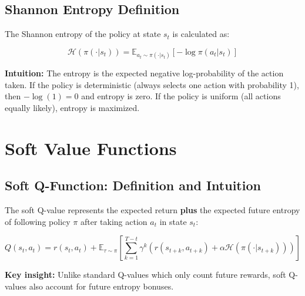 \documentclass[12pt,a4paper]{article}
\theoremstyle{noteplain}
\theoremstyle{noteexercise}
\begin{document}
\subsection{Shannon Entropy Definition}\label{ssec:shannon}



The Shannon entropy of the policy at state $s_t$ is calculated as:

\begin{equation}\label{eq:shannon}
\boxed{\mathcal{H}(\pi(\cdot|s_t)) = \mathbb{E}_{a_t \sim \pi(\cdot|s_t)}[-\log\pi(a_t|s_t)]}
\end{equation}

\textbf{Intuition:} The entropy is the expected negative log-probability of the action taken. If the policy is deterministic (always selects one action with probability 1), then $-\log(1) = 0$ and entropy is zero. If the policy is uniform (all actions equally likely), entropy is maximized.






\section{Soft Value Functions}\label{sec:soft-value}



\subsection{Soft Q-Function: Definition and Intuition}\label{ssec:soft-q}



The soft Q-value represents the expected return \textbf{plus} the expected future entropy of following policy $\pi$ after taking action $a_t$ in state $s_t$:

\begin{equation}\label{eq:soft-q}
\boxed{Q(s_t, a_t) = r(s_t, a_t) + \mathbb{E}_{\tau \sim \pi}\left[\sum_{k=1}^{T-t} \gamma^k \left(r(s_{t+k}, a_{t+k}) + \alpha \mathcal{H}(\pi(\cdot|s_{t+k}))\right)\right]}
\end{equation}

\textbf{Key insight:} Unlike standard Q-values which only count future rewards, soft Q-values also account for future entropy bonuses.
\end{document}
